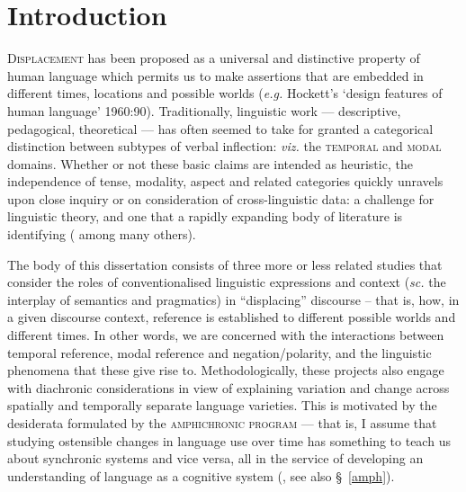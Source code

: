 \documentclass[12pt,dvipsnames]{report}
\begin{document}
\setcounter{tocdepth}{3}\tableofcontents	

\setcounter{chapter}{0}
\setcounter{part}{0}
\reversemarginpar%


\listoffigures
\listoftables
%
	\printglossary[type=gloss,nonumberlist,style=mymcolalttree]
	
\gathertags

\chapter{Introduction}%
%
\label{IntroCh}
\lettrine{D}{isplacement} has been proposed as a universal and distinctive property of human language which permits us to make assertions that are embedded in different times, locations and possible worlds (\textit{e.g.} Hockett's `design features of human language' 1960:90). Traditionally, linguistic work --- descriptive, pedagogical, theoretical --- has often seemed to take for granted a categorical distinction between subtypes of verbal inflection: \textit{viz.} the \textsc{temporal} and \textsc{modal} domains. Whether or not these basic claims are intended as heuristic, the independence of tense, modality, aspect and related categories quickly unravels upon close inquiry or on consideration of cross-linguistic data: a challenge for linguistic theory, and one that a rapidly expanding body of literature is identifying  (\citealp[\textit{e.g.},][]{Condoravdi2002,Laca2012,Hacquard2006,Rullmann2018} among many others).


The body of this dissertation consists of three more or less related studies that consider the roles of conventionalised linguistic expressions and context (\textit{sc.} the interplay of semantics and pragmatics) in ``displacing'' discourse -- that is, how, in a given discourse context, reference is established to different possible worlds and different times. In other words, we are concerned with the interactions between temporal reference, modal reference and negation/polarity, and the linguistic phenomena that these give rise to. Methodologically, these projects also engage with diachronic considerations in view of explaining variation and change across spatially and temporally separate language varieties. This is motivated by the desiderata formulated by the \textsc{amphichronic program} --- that is, I assume that studying ostensible changes in language use over time has something to teach us about synchronic systems and vice versa, all in the service of developing an understanding of language as a cognitive system (\citealp[\textit{e.g.},][]{Kiparsky2006,Deo2015,Anderson2016a}, see also \S~\ref{amph}).
\end{document}
